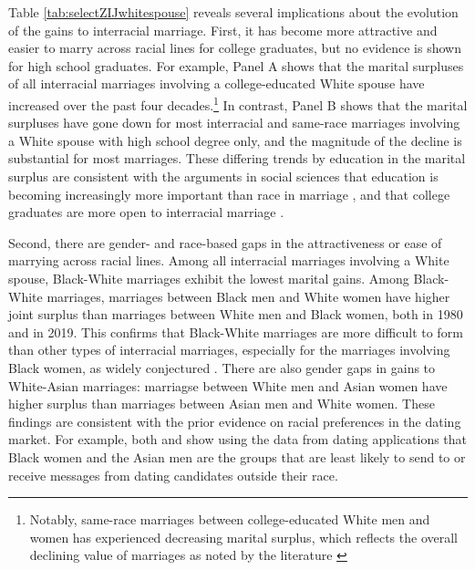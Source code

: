 \vspace{-5ex}



Table \ref{tab:selectZIJwhitespouse} reveals several implications about the evolution of the gains to interracial marriage. First, it has become more attractive and easier to marry across racial lines for college graduates, but no evidence is shown for high school graduates.  For example, Panel A shows that the marital surpluses of all interracial marriages involving a college-educated White spouse have increased over the past four decades.\footnote{Notably, same-race marriages between college-educated White men and women has experienced decreasing marital surplus, which reflects the overall declining value of marriages as noted by the literature \cite{LundbergPollakStearns_2016_FamilyInequality}} In contrast, Panel B shows that the marital surpluses have gone down for most interracial and same-race marriages involving a White spouse with high school degree only, and the magnitude of the decline is substantial for most marriages. These differing trends by education in the marital surplus are consistent with the arguments in social sciences that education is becoming increasingly more important than race in marriage \citep{Kalmijn_1991_StatusHomogamy, Schwartz_2013_AssortativeMating}, and that college graduates are more open to interracial marriage \citep{PewResearch_2017_InterracialMarriage}. 




 
Second, there are gender- and race-based gaps in the attractiveness or ease of marrying across racial lines.  Among all interracial marriages involving a White spouse, Black-White marriages exhibit the lowest marital gains. Among Black-White marriages, marriages between Black men and White women have higher joint surplus than marriages between White men and Black women, both in 1980 and in 2019. This confirms that Black-White marriages are more difficult to form than other types of interracial marriages, especially for the marriages involving Black women, as widely conjectured \citep{Fryer_2007_InterracialMarriagel, oflaherty_book_2015}. There are also gender gaps in gains to White-Asian marriages: marriagse between White men and Asian women have higher surplus than marriages between Asian men and White women. These findings are consistent with the prior evidence on racial preferences in the dating market. For example, both \cite{HitschHortacsuAriely_2010_OnlineDating} and \cite{LinLundquist_2013_MateSelectionCyberspace} show using the data from dating applications that Black women and the Asian men are the groups that are least likely to send to or receive messages from dating candidates outside their race. 
 
